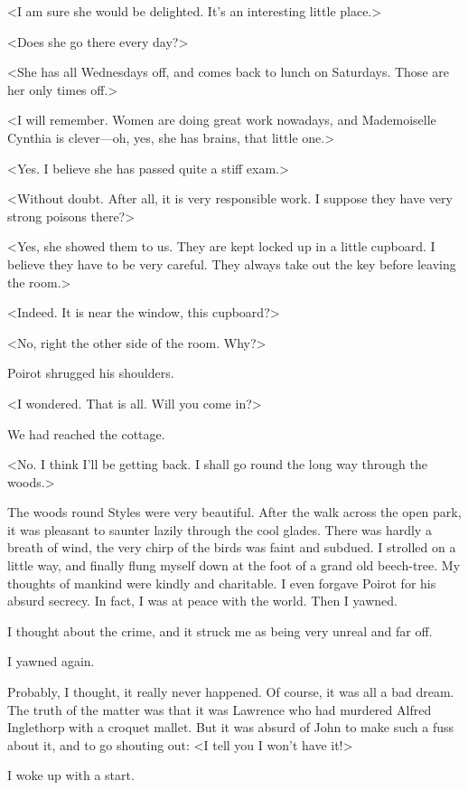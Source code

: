  <I am sure she would be delighted. It's an interesting little place.> 

 <Does she go there every day?> 

 <She has all Wednesdays off, and comes back to lunch on Saturdays. Those are her only times off.> 

 <I will remember. Women are doing great work nowadays, and Mademoiselle Cynthia is clever—oh, yes, she has brains, that little one.> 

 <Yes. I believe she has passed quite a stiff exam.> 

 <Without doubt. After all, it is very responsible work. I suppose they have very strong poisons there?> 

 <Yes, she showed them to us. They are kept locked up in a little cupboard. I believe they have to be very careful. They always take out the key before leaving the room.> 

 <Indeed. It is near the window, this cupboard?> 

 <No, right the other side of the room. Why?> 

 Poirot shrugged his shoulders. 

 <I wondered. That is all. Will you come in?> 

 We had reached the cottage. 

 <No. I think I'll be getting back. I shall go round the long way through the woods.> 

 The woods round Styles were very beautiful. After the walk across the open park, it was pleasant to saunter lazily through the cool glades. There was hardly a breath of wind, the very chirp of the birds was faint and subdued. I strolled on a little way, and finally flung myself down at the foot of a grand old beech-tree. My thoughts of mankind were kindly and charitable. I even forgave Poirot for his absurd secrecy. In fact, I was at peace with the world. Then I yawned. 

 I thought about the crime, and it struck me as being very unreal and far off. 

 I yawned again. 

 Probably, I thought, it really never happened. Of course, it was all a bad dream. The truth of the matter was that it was Lawrence who had murdered Alfred Inglethorp with a croquet mallet. But it was absurd of John to make such a fuss about it, and to go shouting out: <I tell you I won't have it!> 

 I woke up with a start. 

